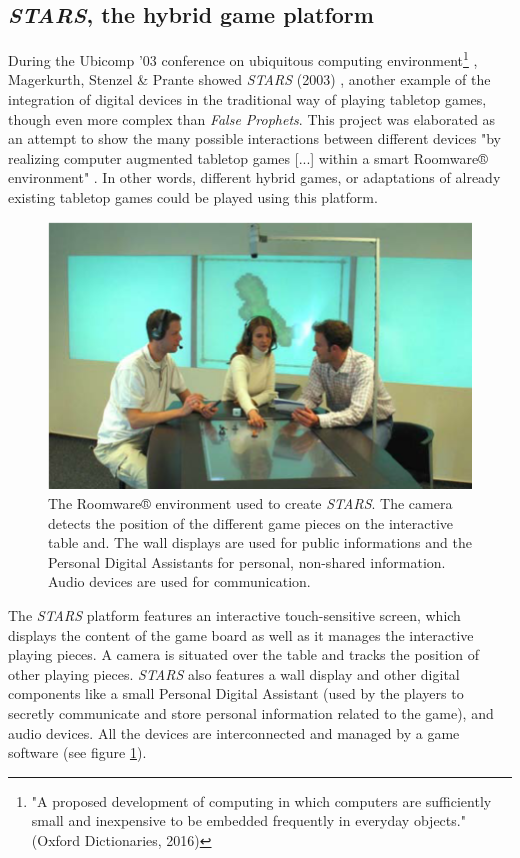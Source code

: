 \subsection{\textit{STARS}, the hybrid game platform}
During the Ubicomp '03 conference on ubiquitous computing environment\footnote{"A proposed development of computing in which computers are sufficiently small and inexpensive to be embedded frequently in everyday objects."(Oxford Dictionaries, 2016)}
, Magerkurth, Stenzel \& Prante showed \textit{STARS} (2003) \cite{art:stars}, another example of the integration of digital devices in the traditional way of playing tabletop games, though even more complex than \textit{False Prophets}. This project was elaborated as an attempt to show the many possible interactions between different devices "by realizing computer augmented tabletop games [...] within a smart Roomware® environment" \cite{art:stars}. In other words, different hybrid games, or adaptations of already existing tabletop games could be played using this platform.

\begin{figure}[!ht]
    \centering
    \includegraphics[scale=0.4]{Images/roomware.png}
    \caption{The Roomware® environment used to create \textit{STARS}. The camera detects the position of the different game pieces on the interactive table and. The wall displays are used for public informations and the Personal Digital Assistants for personal, non-shared information. Audio devices are used for communication.}
    \label{fig:roomware}
\end{figure}

The \textit{STARS} platform features an interactive touch-sensitive screen, which displays the content of the game board as well as it manages the interactive playing pieces. A camera is situated over the table and tracks the position of other playing pieces. \textit{STARS} also features a wall display and other digital components like a small Personal Digital Assistant (used by the players to secretly communicate and store personal information related to the game), and audio devices. All the devices are interconnected and managed by a game software (see figure \ref{fig:roomware}). 

